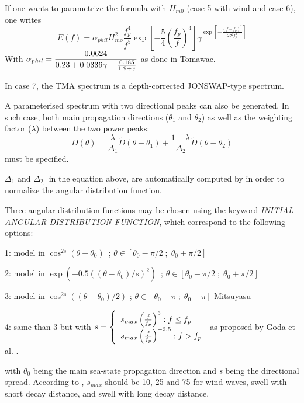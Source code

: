  If one wants to parametrize the formula with $H_{m0}$ (case 5 with wind and case 6), one writes
 \[E(f)=\alpha _{phil} H_{mo}^{2} \frac{f_{p}^{4} }{f^{5} } \exp \left[-\frac{5}{4} \left(\frac{f_{p}^{} }{f^{} } \right)^{4} \right]
 \gamma ^{\exp \left[-\frac{\left(f-f_{p} \right)^{2} }{2\sigma ^{2} f_{p}^{2} } \right]} \]
With $\dsp \alpha _{phil} =\frac{0.0624}{0.23+0.0336\gamma -\frac{0.185}{1.9+\gamma } } $ as done in Tomawac.

 In case 7, the TMA spectrum is a depth-corrected JONSWAP-type spectrum.

 A parameterised spectrum with two directional peaks can also be generated. In such case, both main propagation directions
 ($\theta _{1} $ and $\theta _{2} $) as well as the weighting factor ($\lambda $) between the two power peaks:
 \[D(\theta )=\frac{\lambda }{\Delta _{1} } \tilde{D}(\theta -\theta _{1} )+\frac{1-\lambda }{\Delta _{2} } \tilde{D}(\theta -
 \theta _{2} )\]
must be specified.

$\Delta_{1}$ and $\Delta_{2,}$ in the equation above, are automatically computed by \tomawac in order to normalize the angular
distribution function.

Three angular distribution functions may be chosen using the keyword \textit{INITIAL ANGULAR DISTRIBUTION FUNCTION}, which
correspond to the following options:

 1: model in $\cos ^{2s} (\theta -\theta _{0} )$~; $\theta \in \left[\theta _{0} -\pi /2\; ;\; \theta _{0} +\pi /2\right]$

 2: model in $\exp \left(-0.5\left(\left(\theta -\theta _{0} \right)/s\right)^{2} \right)$~; $\theta \in \left[\theta _{0} -
   \pi /2\; ;\; \theta _{0} +\pi /2\right]$

 3: model in $\cos ^{2s} \left(\left(\theta -\theta _{0} \right)/2\right)$ ; $\theta \in \left[\theta _{0} -\pi \; ;\; \theta _{0}
   +\pi \right]$ Mitsuyasu \cite{Mitsuyasu1975}

 4: same than 3 but with
 $ s=\left\{ \barr{l} s_{max} \left(\frac{f}{f_p} \right)^5 : f\le f_p \\
 s_{max} \left(\frac{f}{f_p} \right)^{-2.5} : f > f_p \earr\right. $ as proposed by Goda et al. \cite{Goda1975}. 
 
 with $\theta_{0}$ being the main sea-state propagation direction and \textit{s} being the directional spread. According to
 \cite{Goda1975}, $s_{max}$ should be 10, 25 and 75 for wind waves, swell with short decay distance, and swell with long decay
 distance.

